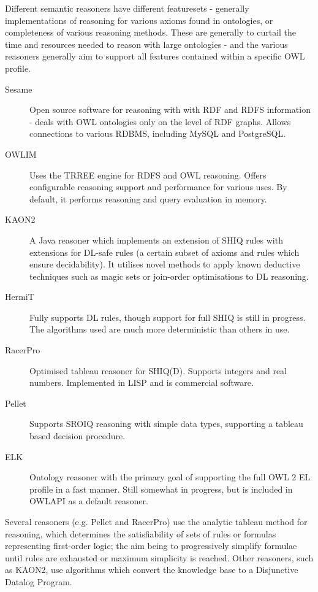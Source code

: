 \documentclass{article}
\begin{document}
Different semantic reasoners have different featuresets - generally
implementations of reasoning for various axioms found in ontologies, or
completeness of various reasoning methods. These are generally to curtail 
the time and resources needed to reason with large ontologies - and the various
reasoners generally aim to support all features contained within a specific OWL
profile\cite{reasonercompare}\cite{reasonerbenchmark}.

\begin{description}
    \item[Sesame] Open source software for reasoning with with RDF and RDFS
    information - deals with OWL ontologies only on the level of RDF graphs.
    Allows connections to various RDBMS, including MySQL and PostgreSQL.
    \item[OWLIM] Uses the TRREE engine for RDFS and OWL reasoning. Offers
    configurable reasoning support and performance for various uses. By default,
    it performs reasoning and query evaluation in memory.
    \item[KAON2] A Java reasoner which implements an extension of SHIQ rules with
    extensions for DL-safe rules (a certain subset of axioms and rules which
    ensure decidability). It utilises novel methods to apply known
    deductive techniques such as magic sets or join-order optimisations
    to DL reasoning.
    \item[HermiT] Fully supports DL rules, though support for full SHIQ is still
    in progress. The algorithms used are much more deterministic than others in
    use.
    \item[RacerPro] Optimised tableau reasoner for SHIQ(D). Supports integers
    and real numbers. Implemented in LISP and is commercial software.
    \item[Pellet] Supports SROIQ reasoning with simple data types, supporting a
    tableau based decision procedure. 
    \item[ELK] Ontology reasoner with the primary goal of supporting the full
    OWL 2 EL profile in a fast manner. Still somewhat in progress, but is included
    in OWLAPI as a default reasoner. 
\end{description}

Several reasoners (e.g. Pellet and RacerPro) use the analytic tableau method for
reasoning, which determines the satisfiability of sets of rules or formulas
representing first-order logic; the aim being to progressively simplify formulae
until rules are exhausted or maximum simplicity is reached. Other reasoners,
such as KAON2, use algorithms which convert the knowledge base to a Disjunctive
Datalog Program.\cite{ddp}
\end{document}
